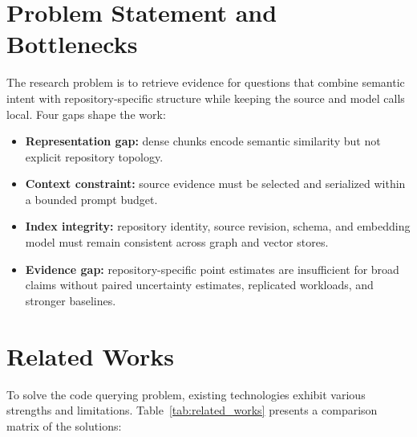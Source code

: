 \documentclass[12pt,letterpaper,oneside]{report}
\begin{document}
\section{Problem Statement and Bottlenecks}
The research problem is to retrieve evidence for questions that combine semantic intent with repository-specific structure while keeping the source and model calls local. Four gaps shape the work:

\begin{itemize}
    \item \textbf{Representation gap:} dense chunks encode semantic similarity but not explicit repository topology.
    \item \textbf{Context constraint:} source evidence must be selected and serialized within a bounded prompt budget.
    \item \textbf{Index integrity:} repository identity, source revision, schema, and embedding model must remain consistent across graph and vector stores.
    \item \textbf{Evidence gap:} repository-specific point estimates are insufficient for broad claims without paired uncertainty estimates, replicated workloads, and stronger baselines.
\end{itemize}

\section{Related Works}
To solve the code querying problem, existing technologies exhibit various strengths and limitations. Table~\ref{tab:related_works} presents a comparison matrix of the solutions:
\end{document}
